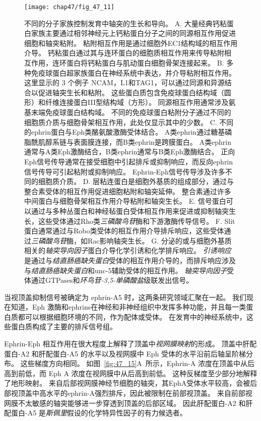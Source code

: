 \begin{figure}[htbp]
	\centering
	\texttt{[image: chap47/fig\_47\_11]}
	\caption{不同的分子家族控制发育中轴突的生长和导向。
		A. 大量经典钙粘蛋白家族主要通过相邻神经元上钙粘蛋白分子之间的同源相互作用促进细胞和轴突粘附。
		粘附相互作用是通过细胞外EC1结构域的相互作用介导。
		钙粘蛋白通过其与连环蛋白的细胞质相互作用来传导粘附相互作用，连环蛋白将钙粘蛋白与肌动蛋白细胞骨架连接起来。
		B. 多种免疫球蛋白超家族蛋白在神经系统中表达，并介导粘附相互作用。
		这里显示的 3 个例子 NCAM，L1和TAG1，可以通过同源和异源结合以促进轴突生长和粘附。
		这些蛋白质包含免疫球蛋白结构域（圆形）和纤维连接蛋白III型结构域（方形）。
		同源相互作用通常涉及氨基末端免疫球蛋白结构域。
		不同的免疫球蛋白粘附分子通过不同的细胞质介质与细胞骨架相互作用，此处仅显示其中的少数。
		C. 不同的ephrin蛋白与Eph类酪氨酸激酶受体结合。
		A类ephrin通过糖基磷脂酰肌醇系链与表面膜连接，而B类ephrin是跨膜蛋白。
		A类ephrin通常与A类Eph激酶结合，B类ephrin通常与B类Eph激酶结合。
		正向Eph信号传导通常在接受细胞中引起排斥或抑制响应，而反向ephrin信号传导可引起粘附或抑制响应。
		Ephrin-Eph信号传导涉及许多不同的细胞质介质。
		D. 层粘连蛋白是细胞外基质的组成部分，通过与整合素受体的相互作用促进细胞粘附和轴突延伸。
		整合素通过许多中间蛋白与细胞骨架相互作用介导粘附和轴突生长。
		E. 信号蛋白可以通过与多种丛蛋白和神经毡蛋白受体相互作用来促进或抑制轴突生长，这些受体通过Rho类\textit{三磷酸鸟苷}酶和下游激酶传导信号。
		F. Slit蛋白通常通过与Robo类受体的相互作用介导排斥响应，这些受体通过\textit{三磷酸鸟苷}酶，如Rac影响轴突生长。
		G. 分泌的或与细胞外基质相关的\textit{轴突导向因子}蛋白介导化学引诱和化学排斥响应。
		\textit{引诱响应}是通过与\textit{结直肠癌缺失蛋白}受体的相互作用介导的，而排斥响应涉及与\textit{结直肠癌缺失蛋白}和unc-5辅助受体的相互作用。
		\textit{轴突导向因子}受体通过GTPases和\textit{环鸟苷-3,5-单磷酸盐}级联发出信号。}
	\label{fig:47_11}
\end{figure}


当视顶盖抑制信号被确定为 ephrin-A5 时，这两条研究领域汇聚在一起。
我们现在知道，Eph 激酶和ephrins在神经和非神经组织中发挥多种功能，并且每一类蛋白质都可以根据细胞环境的不同，作为配体或受体。
在发育中的神经系统中，这些蛋白质构成了主要的排斥信号组。


Ephrin-Eph 相互作用在很大程度上解释了顶盖中\textit{视网膜映射}的形成。
顶盖中肝配蛋白-A2 和肝配蛋白-A5 的水平以及视网膜中 Eph 受体的水平沿前后轴呈阶梯分布。
这些梯度方向相同。
如图~\ref{fig:47_15}A~所示，Ephrin-A 浓度在顶盖中从后高到前低，而 Eph A 浓度在视网膜中从后高到前低。
这种反梯度至少部分地解释了地形映射。
来自后部视网膜神经节细胞的轴突，其EphA受体水平较高，会被后部视顶盖中高水平的ephrin-A强烈排斥，因此被限制在前部视顶盖。
来自前部视网膜不太敏感的轴突能够进一步穿透到顶盖的后部区域。
因此肝配蛋白-A2 和肝配蛋白-A5 是\textit{斯佩里}假设的化学特异性因子的有力候选者。


